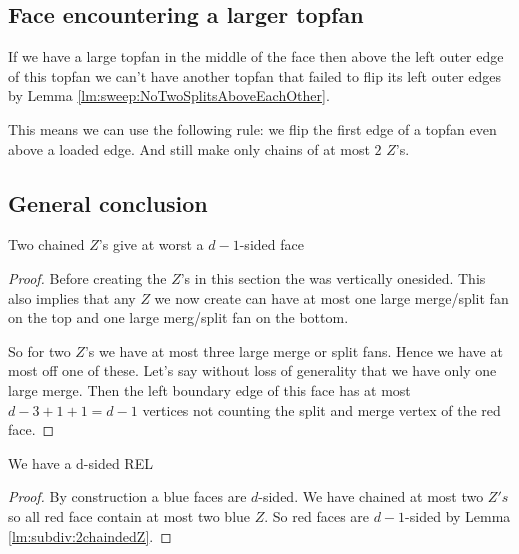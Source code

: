 \subsection{Face encountering a larger topfan}
If we have a large topfan in the middle of the face then above the left outer edge of this topfan we can't have another topfan that failed to flip its left outer edges by Lemma \ref{lm:sweep:NoTwoSplitsAboveEachOther}.

This means we can use the following rule: we flip the first edge of a topfan even above a loaded edge. And still make only chains of at most $2$ $Z$'s.


\subsection{General conclusion}
\begin{lemma}
  \label{lm:subdiv:2chaindedZ}
  Two chained $Z$'s give at worst a $d-1$-sided face
\end{lemma}
\begin{proof}
  Before creating the $Z$'s in this section the \rel was vertically onesided. This also implies that  any $Z$ we now create can have at most one large merge/split fan on the top and one large merg/split fan on the bottom.

  So for two $Z$'s we have at most three large merge or split fans. Hence we have at most off one of these. Let's say without loss of generality that we have only one large merge. Then the left boundary edge of this face has at most $d-3 + 1 +1 =d-1$ vertices not counting the split and merge vertex of the red face.
\end{proof}

\begin{thrm}
  \label{th:final}
  We have a d-sided REL
\end{thrm}

\begin{proof}
  By construction a blue faces are $d$-sided. We have chained at most two $Z's$ so all red face contain at most two blue $Z$. So red faces are $d-1$-sided by Lemma \ref{lm:subdiv:2chaindedZ}.
\end{proof}
